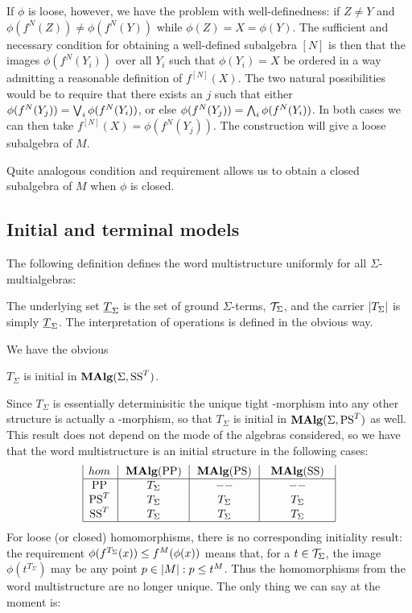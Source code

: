 If $\phi$ is loose, however, we
have the problem with well-definedness: if $Z\not= Y$ and
$\phi(f^N(Z))\not=\phi(f^N(Y))$ while $\phi(Z)=X=\phi(Y)$. The
sufficient and necessary condition for obtaining a well-defined
subalgebra $[N]$ is then that the images $\phi(f^N(Y_i))$ over all
$Y_i$ such that $\phi(Y_i)=X$ be ordered in a way admitting a
reasonable definition of $f^{[N]}(X)$. The two natural possibilities
would be to require that there exists an $j$ such that either
$\phi(f^N(Y_j))=\bigvee_i \phi(f^N(Y_i))$, or else
$\phi(f^N(Y_j))=\bigwedge_i \phi(f^N(Y_i))$. In both cases we can then take
$f^{[N]}(X)=\phi(f^N(Y_j))$. The construction will give a loose subalgebra of $M$.

Quite analogous condition and requirement allows us to obtain a closed
subalgebra of $M$ when $\phi$ is closed.


\subsection{Initial and terminal models}
The following definition defines the word multistructure uniformly for
 all $\Sigma$-multialgebras:
\begin{Definition}
The underlying set $\underline {T}_\Sigma$ is the set of ground $\Sigma$-terms,
 ${\cal T}_{\Sigma}$, and the carrier $|T_\Sigma|$ is simply $\underline {T}_\Sigma$.
The interpretation of operations is defined in the obvious way.
\end{Definition}
We have the obvious
\begin{Fact}
 $T_\Sigma$ is initial in $\mbox{\rm\bf MAlg}(\Sigma,{\rm SS}^T)$.
\end{Fact}
Since $T_\Sigma$ is essentially determinisitic the unique tight \SSs-morphism into
any other structure is actually a \PS-morphism, so that $T_\Sigma$ is initial
in $\mbox{\rm\bf MAlg}(\Sigma,{\rm PS}^T)$ as well. This result does not depend on the mode of the
algebras considered, so we have that
the word multistructure is an initial structure in the following cases:
\[
\begin{array}{|c@{\ \ }|@{\ \ }c@{\ \ }|@{\ \ }c@{\ \ }|@{\ \ \ }c@{\ \ \ }|}
hom & \MAlg(\PP) & \MAlg(\PS) & \MAlg(\SSs) \\ \hline
\PP  & T_\Sigma & --  & -- \\
\PS^T  & T_\Sigma & T_\Sigma & T_\Sigma \\
\SSs^T & T_\Sigma & T_\Sigma & T_\Sigma \\ \hline
\end{array} 
\]
For loose (or closed) homomorphisms, there is no
corresponding initiality result: the requirement
$\phi(f^{{T_\Sigma}}(x))\leq f^M(\phi(x))$ means that, for a
$t\in{\cal T}_{\Sigma}$, the image $\phi(t^{{T_\Sigma}})$ may be any point
$p\in|M|:p\leq t^M$. Thus the homomorphisms from the word
multistructure are no longer unique. The only thing we can say at the moment is:

